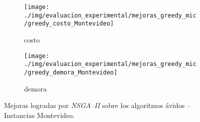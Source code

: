 \begin{figure}[!htpb]
\centering
\begin{subfigure}{.5\textwidth}
  \centering
  \texttt{[image: ./img/evaluacion\_experimental/mejoras\_greedy\_mic/greedy\_costo\_Montevideo]}
  \caption{costo}
  \label{fig:mejoras_greedy_costo_mic_montevideo}
\end{subfigure}%
\begin{subfigure}{.5\textwidth}
  \centering
  \texttt{[image: ./img/evaluacion\_experimental/mejoras\_greedy\_mic/greedy\_demora\_Montevideo]}
  \caption{demora}
  \label{fig:mejoras_greedy_demora_mic_montevideo}
\end{subfigure}
\caption{Mejoras logradas por \textit{NSGA--II} sobre los algoritmos ávidos -- Instancias Montevideo.}
\label{fig:mejoras_greedy_mic_montevideo}
\end{figure}